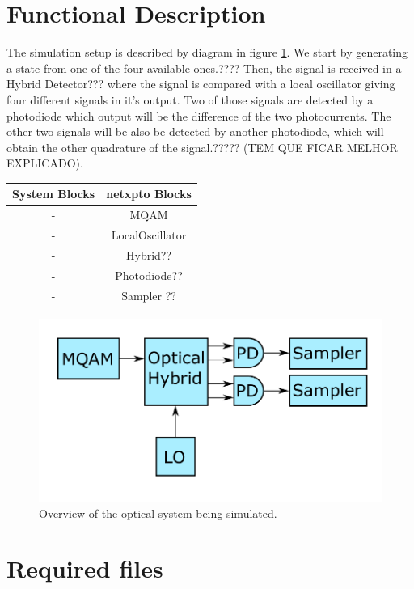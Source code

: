 \documentclass[a4paper]{article}
\begin{document}
\section{Functional Description}

The simulation setup is described by diagram in figure \ref{fig:setup}. We start by generating a state from one of the four available ones.???? Then, the signal is received in a Hybrid Detector??? where the signal is compared with a local oscillator giving four different signals in it's output. Two of those signals are detected by a photodiode which output will be the difference of the two photocurrents. The other two signals will be also be detected by another photodiode, which will obtain the other quadrature of the signal.????? (TEM QUE FICAR MELHOR EXPLICADO).



\begin{table}[H]
\centering
\begin{tabular}{c|c}
System Blocks          & netxpto Blocks       \\ \hline
- & MQAM \\
- & LocalOscillator \\
- & Hybrid?? \\
- & Photodiode??\\
- & Sampler ??\\
\end{tabular}
\end{table}


\begin{figure}[h]
\centering
\includegraphics[width=\linewidth]{../img/scheme1.pdf}
\caption{Overview of the optical system being simulated.}
\label{fig:setup}
\end{figure}


\section{Required files}\label{Required files}
\end{document}
